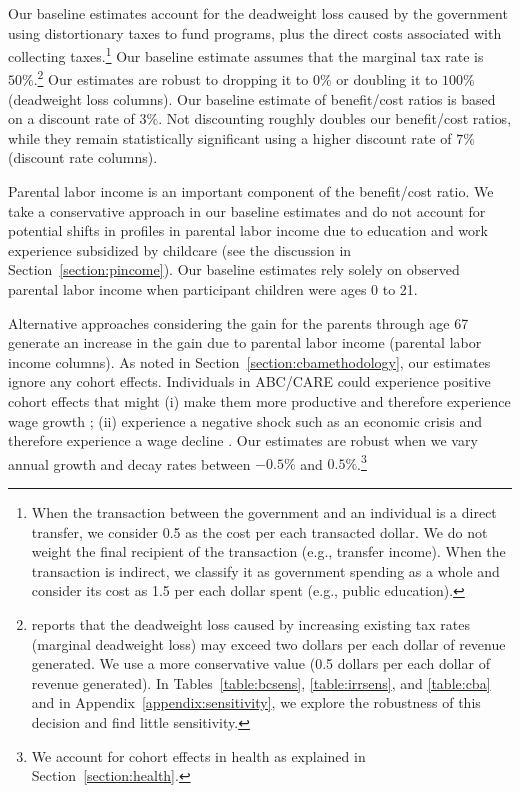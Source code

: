 Our baseline estimates account for the deadweight loss caused by the government using distortionary taxes to fund programs, plus the direct costs associated with collecting taxes.\footnote{When the transaction between the government and an individual is a direct transfer, we consider 0.5 as the cost per each transacted dollar. We do not weight the final recipient of the transaction (e.g., transfer income). When the transaction is indirect, we classify it as government spending as a whole and consider its cost as 1.5 per each dollar spent (e.g., public education).} Our baseline estimate assumes that the marginal tax rate is $50\%$.\footnote{\citet{Feldstein_1999_REStat} reports that the deadweight loss caused by increasing existing tax rates (marginal deadweight loss) may exceed two dollars per each dollar of revenue generated. We use a more conservative value (0.5 dollars per each dollar of revenue generated). In Tables~\ref{table:bcsens}, \ref{table:irrsens}, and \ref{table:cba} and in  Appendix~\ref{appendix:sensitivity}, we explore the robustness of this decision and find little sensitivity.} Our estimates are robust to dropping it to $0\%$ or doubling it to $100\%$ (deadweight loss columns). Our baseline estimate of benefit/cost ratios is based on a discount rate of $3\%$. Not discounting roughly doubles our benefit/cost ratios, while they remain statistically significant using a higher discount rate of $7\%$ (discount rate columns).

Parental labor income is an important component of the benefit/cost ratio. We take a conservative approach in our baseline estimates and do not account for potential shifts in profiles in parental labor income due to education and work experience subsidized by childcare (see the discussion in Section~\ref{section:pincome}). Our baseline estimates rely solely on observed parental labor income when participant children were ages 0 to 21.

Alternative approaches considering the gain for the parents through age 67 generate an increase in the gain due to parental labor income (parental labor income columns). As noted in Section~\ref{section:cbamethodology}, our estimates ignore any cohort effects. Individuals in ABC/CARE could experience positive cohort effects that might (i) make them more productive and therefore experience wage growth \citep{Lagakos_Moll_etal_2016_LifeCycle_NBER}; (ii) experience a negative shock such as an economic crisis and therefore experience a wage decline \citep{Jarosch_2016_JobSecurity_Econometrica}. Our estimates are robust when we vary annual growth and decay rates between $-0.5\%$ and $0.5\%$.\footnote{We account for cohort effects in health as explained in Section~\ref{section:health}.}

